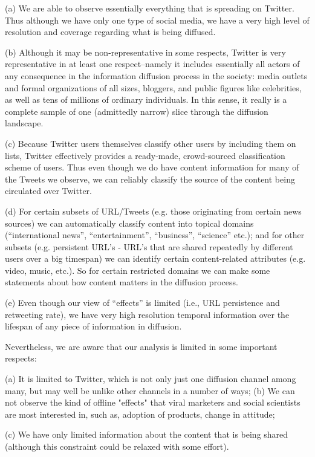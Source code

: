 \documentclass[phd,tocprelim]{cornell}
\begin{document}
(a) We are able to observe essentially everything that is spreading on Twitter. Thus although we have only one type of social media, we have a very high level of resolution and coverage regarding what is being diffused.

(b) Although it may be non-representative in some respects, Twitter is very representative in at least one respect--namely it includes essentially all actors of any consequence in the information diffusion process in the society: media outlets and formal organizations of all sizes, bloggers, and public figures like celebrities, as well as tens of millions of ordinary individuals. In this sense, it really is a complete sample of one (admittedly narrow) slice through the diffusion landscape. 

(c) Because Twitter users themselves classify other users by including them on lists, Twitter effectively provides a ready-made, crowd-sourced classification scheme of users. Thus even though we do have content information for many of the Tweets we observe, we can reliably classify the source of the content being circulated over Twitter.  

(d) For certain subsets of URL/Tweets (e.g. those originating from certain news sources) we can automatically classify content into topical domains (``international news'', ``entertainment'', ``business'', ``science'' etc.); and for other subsets (e.g. persistent URL's - URL's that are shared repeatedly by different users over a big timespan) we can identify certain content-related attributes (e.g. video, music, etc.). So for certain restricted domains we can make some statements about how content matters in the diffusion process.

(e) Even though our view of ``effects'' is limited (i.e., URL persistence and retweeting rate), we have very high resolution temporal information over the lifespan of any piece of information in diffusion.


Nevertheless, we are aware that our analysis is limited in some important respects:

(a) It is limited to Twitter, which is not only just one diffusion channel among many, but may well be unlike other channels in a number of ways; 
(b) We can not observe the kind of offline "effects" that viral marketers and social scientists are most interested in, such as, adoption of products, change in attitude;

(c) We have only limited information about the content that is being shared (although this constraint could be relaxed with some effort).
\end{document}
